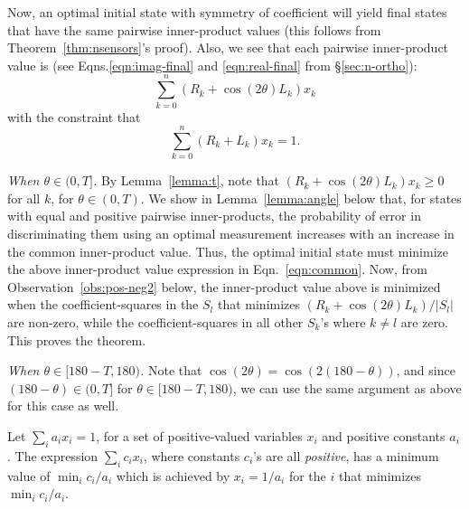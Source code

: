 \begin{prf}
Now, an optimal initial state with symmetry of coefficient will yield 
final states that have the same pairwise inner-product values (this follows from Theorem~\ref{thm:nsensors}'s proof). 
Also, we see that each pairwise inner-product value is (see Eqns.\ref{eqn:imag-final} and \ref{eqn:real-final} from \S\ref{sec:n-ortho}):
\begin{equation}
\sum_{k=0}^{n} ( R_k + \cos(2\theta) L_k) x_k \label{eqn:common}
\end{equation}
with the constraint that
$$ \sum_{k=0}^{n} ( R_k + L_k) x_k = 1.$$

{\em When $\theta \in (0, T]$.}
By Lemma~\ref{lemma:t}, note that $(R_k + \cos(2\theta) L_k) x_k \geq 0$ for all $k$, for 
$\theta \in (0,T)$. 
We show in Lemma~\ref{lemma:angle} below that, for states with equal and positive
pairwise inner-products, the probability of error in discriminating them using an optimal
measurement increases with an increase in the common inner-product value. 
Thus, the optimal initial state must minimize the above inner-product value expression in Eqn.~\ref{eqn:common}.
Now, from Observation~\ref{obs:pos-neg2} below, the inner-product value above is minimized when the coefficient-squares in the $S_l$ that minimizes $(R_k + \cos(2\theta) L_k)/|S_l|$ are non-zero, while the coefficient-squares in all other 
$S_k$'s where $k \neq l$ are zero. This proves the theorem.


{\em When $\theta \in [180-T, 180)$.} 
Note that $\cos(2\theta) = \cos(2(180-\theta))$, and since $(180-\theta) \in (0, T]$ for  
$\theta \in [180-T, 180)$, we can use the same argument as above for this case as well.
\end{prf}

\begin{observation}
Let $\sum_i a_i x_i =1$, for a set of positive-valued variables $x_i$ and positive constants $a_i$. 
The expression $\sum_i c_ix_i$, where constants $c_i$'s are all {\em positive}, has a minimum value of $\min_i c_i/a_i$ which is achieved by $x_i = 1/a_i$ for the $i$ that minimizes $\min_i c_i/a_i$. 
\label{obs:pos-neg2}
\end{observation}



